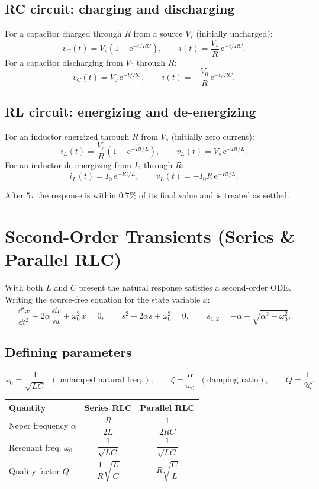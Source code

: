 \documentclass{essay}
\newcommand{\ee}{\mathrm{e}}
\begin{document}
\subsection{RC circuit: charging and discharging}
For a capacitor charged through \(R\) from a source \(V_{s}\) (initially uncharged):
\[ v_{C}(t) = V_{s}\!\left(1-\ee^{-t/RC}\right), \qquad i(t) = \frac{V_{s}}{R}\,\ee^{-t/RC}. \]
For a capacitor discharging from \(V_{0}\) through \(R\):
\[ v_{C}(t) = V_{0}\,\ee^{-t/RC}, \qquad i(t) = -\frac{V_{0}}{R}\,\ee^{-t/RC}. \]

\subsection{RL circuit: energizing and de-energizing}
For an inductor energized through \(R\) from \(V_{s}\) (initially zero current):
\[ i_{L}(t) = \frac{V_{s}}{R}\!\left(1-\ee^{-Rt/L}\right), \qquad v_{L}(t) = V_{s}\,\ee^{-Rt/L}. \]
For an inductor de-energizing from \(I_{0}\) through \(R\):
\[ i_{L}(t) = I_{0}\,\ee^{-Rt/L}, \qquad v_{L}(t) = -I_{0} R\,\ee^{-Rt/L}. \]

After \(5\tau\) the response is within \(0.7\%\) of its final value and is treated
as settled.

\section{Second-Order Transients (Series \& Parallel RLC)}

With both \(L\) and \(C\) present the natural response satisfies a second-order
ODE. Writing the source-free equation for the state variable \(x\):
\[ \frac{\dd^{2} x}{\dd t^{2}} + 2\alpha\,\frac{\dd x}{\dd t} + \omega_{0}^{2}\,x = 0, \qquad s^{2} + 2\alpha s + \omega_{0}^{2} = 0, \qquad s_{1,2} = -\alpha \pm \sqrt{\alpha^{2} - \omega_{0}^{2}}. \]

\subsection{Defining parameters}
\[ \omega_{0} = \frac{1}{\sqrt{LC}} \;\;(\text{undamped natural freq.}), \qquad \zeta = \frac{\alpha}{\omega_{0}} \;\;(\text{damping ratio}), \qquad Q = \frac{1}{2\zeta}. \]
\begin{center}
  \begin{tabular}{@{}lcc@{}}
    \hline
    \textbf{Quantity} & \textbf{Series RLC} & \textbf{Parallel RLC}\\
    \hline
    Neper frequency \(\alpha\) & \(\dfrac{R}{2L}\) & \(\dfrac{1}{2RC}\)\\
    Resonant freq. \(\omega_{0}\) & \(\dfrac{1}{\sqrt{LC}}\) &
    \(\dfrac{1}{\sqrt{LC}}\)\\
    Quality factor \(Q\) & \(\dfrac{1}{R}\sqrt{\dfrac{L}{C}}\) &
    \(R\sqrt{\dfrac{C}{L}}\)\\
    \hline
  \end{tabular}
\end{center}
\end{document}
